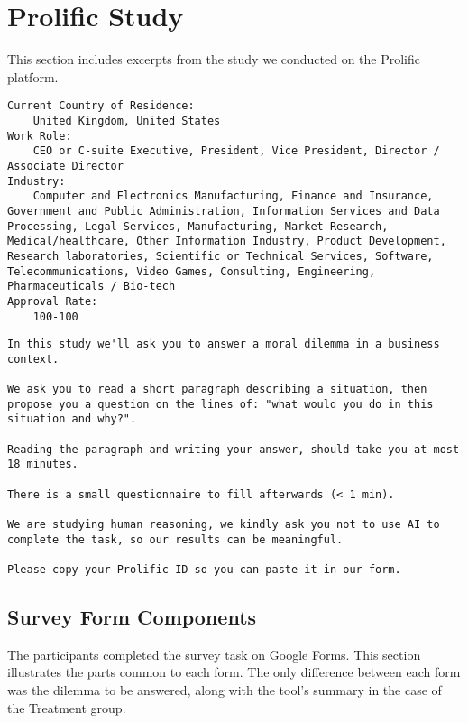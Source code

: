 \section{Prolific Study}
\label{sec:study}

This section includes excerpts from the study we conducted on the Prolific platform.

\renewcommand{\lstlistingname}{Description}

\begin{lstlisting}[caption={Screeners set}, label={desc:screeners}]
Current Country of Residence:
    United Kingdom, United States
Work Role:
    CEO or C-suite Executive, President, Vice President, Director / Associate Director
Industry:
    Computer and Electronics Manufacturing, Finance and Insurance, Government and Public Administration, Information Services and Data Processing, Legal Services, Manufacturing, Market Research, Medical/healthcare, Other Information Industry, Product Development, Research laboratories, Scientific or Technical Services, Software, Telecommunications, Video Games, Consulting, Engineering, Pharmaceuticals / Bio-tech
Approval Rate:
    100-100
\end{lstlisting}

\begin{lstlisting}[caption={Onboarding study description}, label={desc:study}]
In this study we'll ask you to answer a moral dilemma in a business context.

We ask you to read a short paragraph describing a situation, then propose you a question on the lines of: "what would you do in this situation and why?".

Reading the paragraph and writing your answer, should take you at most 18 minutes.

There is a small questionnaire to fill afterwards (< 1 min).

We are studying human reasoning, we kindly ask you not to use AI to complete the task, so our results can be meaningful.

Please copy your Prolific ID so you can paste it in our form.
\end{lstlisting}

\subsection{Survey Form Components}
\label{sec:form}

\renewcommand{\lstlistingname}{Component}

The participants completed the survey task on Google Forms.
This section illustrates the parts common to each form.
The only difference between each form was the dilemma to be answered, along with the tool's summary in the case of the Treatment group.


